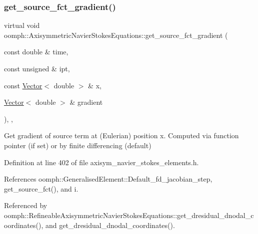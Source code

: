 \subsubsection{\texorpdfstring{get\+\_\+source\+\_\+fct\+\_\+gradient()}{get\_source\_fct\_gradient()}}
{\footnotesize\ttfamily virtual void oomph\+::\+Axisymmetric\+Navier\+Stokes\+Equations\+::get\+\_\+source\+\_\+fct\+\_\+gradient (\begin{DoxyParamCaption}\item[{const double \&}]{time,  }\item[{const unsigned \&}]{ipt,  }\item[{const \hyperlink{classoomph_1_1Vector}{Vector}$<$ double $>$ \&}]{x,  }\item[{\hyperlink{classoomph_1_1Vector}{Vector}$<$ double $>$ \&}]{gradient }\end{DoxyParamCaption})\hspace{0.3cm}{\ttfamily [inline]}, {\ttfamily [protected]}, {\ttfamily [virtual]}}

Get gradient of source term at (Eulerian) position x. Computed via function pointer (if set) or by finite differencing (default) 

Definition at line 402 of file axisym\+\_\+navier\+\_\+stokes\+\_\+elements.\+h.



References oomph\+::\+Generalised\+Element\+::\+Default\+\_\+fd\+\_\+jacobian\+\_\+step, get\+\_\+source\+\_\+fct(), and i.



Referenced by oomph\+::\+Refineable\+Axisymmetric\+Navier\+Stokes\+Equations\+::get\+\_\+dresidual\+\_\+dnodal\+\_\+coordinates(), and get\+\_\+dresidual\+\_\+dnodal\+\_\+coordinates().

\mbox{\label{classoomph_1_1AxisymmetricNavierStokesEquations_a6b75b0e3184053cbf32458df944ec330}} 
